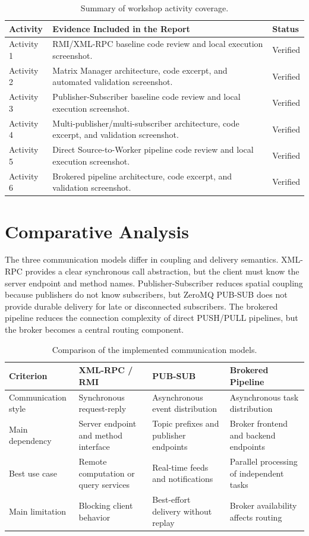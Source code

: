 \documentclass[11pt,a4paper]{article}
\begin{document}
\begin{table}[H]
\centering
\caption{Summary of workshop activity coverage.}
\small
\begin{tabularx}{\textwidth}{@{}p{2.3cm}Y p{2.0cm}@{}}
\toprule
\textbf{Activity} & \textbf{Evidence Included in the Report} & \textbf{Status} \\
\midrule
Activity 1 & RMI/XML-RPC baseline code review and local execution screenshot. & Verified \\
Activity 2 & Matrix Manager architecture, code excerpt, and automated validation screenshot. & Verified \\
Activity 3 & Publisher-Subscriber baseline code review and local execution screenshot. & Verified \\
Activity 4 & Multi-publisher/multi-subscriber architecture, code excerpt, and validation screenshot. & Verified \\
Activity 5 & Direct Source-to-Worker pipeline code review and local execution screenshot. & Verified \\
Activity 6 & Brokered pipeline architecture, code excerpt, and validation screenshot. & Verified \\
\bottomrule
\end{tabularx}
\end{table}

\section{Comparative Analysis}

The three communication models differ in coupling and delivery semantics.
XML-RPC provides a clear synchronous call abstraction, but the client must know
the server endpoint and method names. Publisher-Subscriber reduces spatial
coupling because publishers do not know subscribers, but ZeroMQ PUB-SUB does not
provide durable delivery for late or disconnected subscribers. The brokered
pipeline reduces the connection complexity of direct PUSH/PULL pipelines, but
the broker becomes a central routing component.

\begin{table}[H]
\centering
\caption{Comparison of the implemented communication models.}
\small
\begin{tabularx}{\textwidth}{@{}p{3.1cm}Y Y Y@{}}
\toprule
\textbf{Criterion} & \textbf{XML-RPC / RMI} & \textbf{PUB-SUB} & \textbf{Brokered Pipeline} \\
\midrule
Communication style & Synchronous request-reply & Asynchronous event distribution & Asynchronous task distribution \\
Main dependency & Server endpoint and method interface & Topic prefixes and publisher endpoints & Broker frontend and backend endpoints \\
Best use case & Remote computation or query services & Real-time feeds and notifications & Parallel processing of independent tasks \\
Main limitation & Blocking client behavior & Best-effort delivery without replay & Broker availability affects routing \\
\bottomrule
\end{tabularx}
\end{table}
\end{document}
